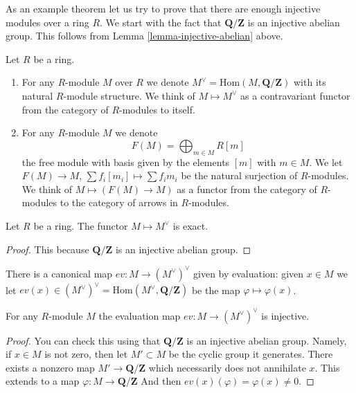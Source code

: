 \noindent 
As an example theorem let us try to prove that there are enough injective
modules over a ring $R$. We start with the fact that $\mathbf{Q}/\mathbf{Z}$ 
is an injective abelian group. This follows from
Lemma \ref{lemma-injective-abelian} above.

\begin{definition}
\label{definition-simple-functors}
Let $R$ be a ring.
\begin{enumerate}
\item For any $R$-module $M$ over $R$ we denote 
$M^\vee = \text{Hom}(M,\mathbf{Q}/\mathbf{Z})$
with its natural $R$-module structure. We think
of $M \mapsto M^\vee$ as a contravariant functor
from the category of $R$-modules to itself.
\item For any $R$-module $M$ we denote
$$
F(M) = \bigoplus\nolimits_{m \in M} R[m]
$$
the free module with basis given by the elements $[m]$ with
$m \in M$. We let $F(M)\to M$, $\sum f_i [m_i] \mapsto \sum f_i m_i$
be the natural surjection of $R$-modules.
We think of $M \mapsto (F(M) \to M)$ as a functor from
the category of $R$-modules to the category of
arrows in $R$-modules.
\end{enumerate}
\end{definition}

\begin{lemma}
\label{lemma-vee-exact}
Let $R$ be a ring.
The functor $M \mapsto M^\vee$ is exact.
\end{lemma}

\begin{proof}
This because $\mathbf{Q}/\mathbf{Z}$
is an injective abelian group.
\end{proof}

\noindent
There is a canonical map $ev : M \to (M^\vee)^\vee$
given by evaluation: given $x \in M$ we let
$ev(x) \in (M^\vee)^\vee = \text{Hom}(M^\vee, \mathbf{Q}/\mathbf{Z})$
be the map $\varphi \mapsto \varphi(x)$.

\begin{lemma}
\label{lemma-ev-injective}
For any $R$-module $M$ the evaluation map
$ev : M \to (M^\vee)^\vee$ is injective.
\end{lemma}

\begin{proof}
You can check this using that $\mathbf{Q}/\mathbf{Z}$ is an injective
abelian group. Namely, if $x \in M$ is not zero, then let
$M' \subset M$ be the cyclic group it generates. There exists
a nonzero map $M' \to \mathbf{Q}/\mathbf{Z}$ which necessarily does
not annihilate $x$. This extends to
a map $\varphi : M \to \mathbf{Q}/\mathbf{Z}$
And then $ev(x)(\varphi) = \varphi(x) \not = 0$.
\end{proof}

